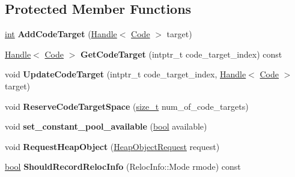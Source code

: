 \subsection*{Protected Member Functions}
\begin{DoxyCompactItemize}
\item 
\mbox{\label{classv8_1_1internal_1_1AssemblerBase_ac2772481a1cc73e202085b79576b21bc}} 
\mbox{\hyperlink{classint}{int}} {\bfseries Add\+Code\+Target} (\mbox{\hyperlink{classv8_1_1internal_1_1Handle}{Handle}}$<$ \mbox{\hyperlink{classv8_1_1internal_1_1Code}{Code}} $>$ target)
\item 
\mbox{\label{classv8_1_1internal_1_1AssemblerBase_adc3047aae59b7f1f8e42d21c5283f360}} 
\mbox{\hyperlink{classv8_1_1internal_1_1Handle}{Handle}}$<$ \mbox{\hyperlink{classv8_1_1internal_1_1Code}{Code}} $>$ {\bfseries Get\+Code\+Target} (intptr\+\_\+t code\+\_\+target\+\_\+index) const
\item 
\mbox{\label{classv8_1_1internal_1_1AssemblerBase_afa971e6868d375bd914ea095ed5a6e6f}} 
void {\bfseries Update\+Code\+Target} (intptr\+\_\+t code\+\_\+target\+\_\+index, \mbox{\hyperlink{classv8_1_1internal_1_1Handle}{Handle}}$<$ \mbox{\hyperlink{classv8_1_1internal_1_1Code}{Code}} $>$ target)
\item 
\mbox{\label{classv8_1_1internal_1_1AssemblerBase_a621b1b9160ea3e9ac0e94a80f3b470ee}} 
void {\bfseries Reserve\+Code\+Target\+Space} (\mbox{\hyperlink{classsize__t}{size\+\_\+t}} num\+\_\+of\+\_\+code\+\_\+targets)
\item 
\mbox{\label{classv8_1_1internal_1_1AssemblerBase_af45536e3cf5df4078e5b8e2b5bb54dba}} 
void {\bfseries set\+\_\+constant\+\_\+pool\+\_\+available} (\mbox{\hyperlink{classbool}{bool}} available)
\item 
\mbox{\label{classv8_1_1internal_1_1AssemblerBase_a6b964ee2e88e862d7033f325f819f1db}} 
void {\bfseries Request\+Heap\+Object} (\mbox{\hyperlink{classv8_1_1internal_1_1HeapObjectRequest}{Heap\+Object\+Request}} request)
\item 
\mbox{\label{classv8_1_1internal_1_1AssemblerBase_a113d8ab26464ef685b0d08dfe5d3d2d5}} 
\mbox{\hyperlink{classbool}{bool}} {\bfseries Should\+Record\+Reloc\+Info} (Reloc\+Info\+::\+Mode rmode) const
\end{DoxyCompactItemize}
